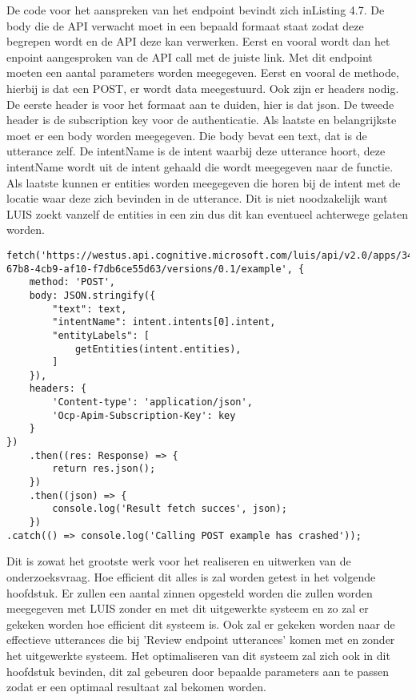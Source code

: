 De code voor het aanspreken van het endpoint bevindt zich inListing 4.7. De body die de API verwacht moet in een bepaald formaat staat zodat deze begrepen wordt en de API deze kan verwerken. Eerst en vooral wordt dan het enpoint aangesproken van de API call met de juiste link. Met dit endpoint moeten een aantal parameters worden meegegeven. Eerst en vooral de methode, hierbij is dat een POST, er wordt data meegestuurd. Ook zijn er headers nodig. De eerste header is voor het formaat aan te duiden, hier is dat json. De tweede header is de subscription key voor de authenticatie. Als laatste en belangrijkste moet er een body worden meegegeven. Die body bevat een text, dat is de utterance zelf. De intentName is de intent waarbij deze utterance hoort, deze intentName wordt uit de intent gehaald die wordt meegegeven naar de functie. Als laatste kunnen er entities worden meegegeven die horen bij de intent met de locatie waar deze zich bevinden in de utterance. Dit is niet noodzakelijk want LUIS zoekt vanzelf de entities in een zin dus dit kan eventueel achterwege gelaten worden.

\medskip
\begin{lstlisting}[caption=Toevoegen van een input aan LUIS van een API call]
fetch('https://westus.api.cognitive.microsoft.com/luis/api/v2.0/apps/3480e277-67b8-4cb9-af10-f7db6ce55d63/versions/0.1/example', {
	method: 'POST',
	body: JSON.stringify({
		"text": text,
		"intentName": intent.intents[0].intent,
		"entityLabels": [
			getEntities(intent.entities),
		]
	}),
	headers: {
		'Content-type': 'application/json',
		'Ocp-Apim-Subscription-Key': key
	}
})
	.then((res: Response) => {
		return res.json();
	})
	.then((json) => {
		console.log('Result fetch succes', json);
	})
.catch(() => console.log('Calling POST example has crashed'));
\end{lstlisting}

Dit is zowat het grootste werk voor het realiseren en uitwerken van de onderzoeksvraag. Hoe efficient dit alles is zal worden getest in het volgende hoofdstuk. Er zullen een aantal zinnen opgesteld worden die zullen worden meegegeven met LUIS zonder en met dit uitgewerkte systeem en zo zal er gekeken worden hoe efficient dit systeem is. Ook zal er gekeken worden naar de effectieve utterances die bij 'Review endpoint utterances' komen met en zonder het uitgewerkte systeem. Het optimaliseren van dit systeem zal zich ook in dit hoofdstuk bevinden, dit zal gebeuren door bepaalde parameters aan te passen zodat er een optimaal resultaat zal bekomen worden.

